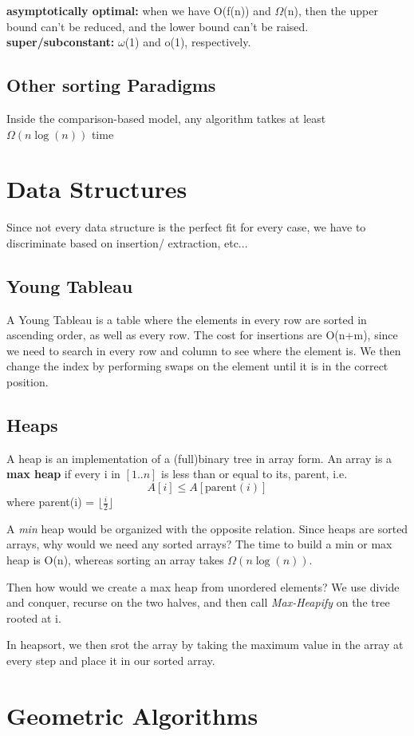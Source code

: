 \documentclass[portrait,10pt,a4paper]{article}
\begin{document}
\begin{multicols*}{3}
\textbf{asymptotically optimal:} when we have O(f(n)) and $\Omega$(n), then the upper bound can't be 
reduced, and the lower bound can't be raised.
\textbf{super/subconstant:} $\omega$(1) and o(1), respectively.

\subsection{Other sorting Paradigms}
Inside the comparison-based model, any algorithm tatkes at least $\Omega(n\log(n))$ time

\section{Data Structures}
Since not every data structure is the perfect fit for every case, we have to discriminate based on insertion/
extraction, etc...
\subsection{Young Tableau}
A Young Tableau is a table where the elements in every row are sorted in ascending order, as well as every row.
The cost for insertions are O(n+m), since we need to  search in every row and column to see where the element is.
We then change the index by performing swaps on the element until it is in the correct position.
\subsection{Heaps}
A heap is an implementation of a (full)binary tree in array form. An array is a \textbf{max heap} if every i in $[1..n]$
is less than or equal to its, parent, i.e.
$$A[i] \leq A[\text{parent}(i)]$$
where parent(i) = $\lfloor \frac{i}{2} \rfloor$

A \textit{min} heap would be organized with the opposite relation. Since heaps are sorted arrays, why would we need 
any sorted arrays? The time to build a min or max heap is O(n), whereas sorting an array takes $\Omega(n\log(n))$.

Then how would we create a max heap from unordered elements? We use divide and conquer, recurse on the two halves, 
and then call \textit{Max-Heapify} on the tree rooted at i. 

In heapsort, we then srot the array by taking the maximum value in the array at every step and place it in our sorted array.
\section{Geometric Algorithms}

\end{multicols*}
\end{document}
